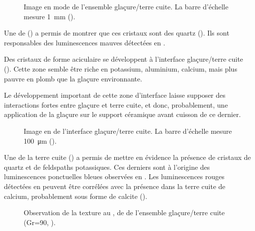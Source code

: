 \begin{figure}[htb]
  \caption[\ -- Observation de la texture au \MEB, 
           en mode \ERD. Ensemble glaçure/terre cuite]
          {\legendeB
           Image en mode \ERD de l'ensemble glaçure/terre cuite. 
           La barre d'échelle mesure \SI{1}{\mm} ().}
  \label{MEB:6529_img}
\end{figure}

Une \carto de \RX () a permis de montrer 
que ces cristaux sont des quartz (\quartz). Ils sont responsables 
des luminescences mauves détectées en \CL.

Des cristaux de forme aciculaire se développent à l'interface 
glaçure/terre cuite (). Cette zone semble être 
riche en potassium, aluminium, calcium, mais plus pauvre en plomb que 
la glaçure environnante.

Le développement important de cette zone d'interface laisse supposer 
des interactions fortes entre glaçure et terre cuite, et donc, 
probablement, une application de la glaçure sur le support céramique 
avant cuisson de ce dernier.

\begin{figure}[htb]
  \caption[\ -- Observation de la texture au \MEB, 
           en mode \ERD. Interface glaçure/terre cuite]
          {\legendeB
           Image en \ERD de l'interface glaçure/terre cuite. 
           La barre d'échelle mesure \SI{100}{\um} ().}
  \label{MEB:6529_img_int}
\end{figure}

Une \carto de la terre cuite () a permis de 
mettre en évidence la présence de cristaux de quartz et de feldspaths 
potassiques. Ces derniers sont à l'origine des luminescences 
ponctuelles bleues observées en \CL. Les luminescences rouges 
détectées en \CL peuvent être corrélées avec la présence dans la terre 
cuite de calcium, probablement sous forme de calcite (\calcite).

\begin{figure}[htb]
  \caption[\ -- Observation de la texture au \MEB, \carto de \RX de l'ensemble glaçure/terre cuite]
          {\legendeB
           Observation de la texture au \MEB, \carto de \RX de l'ensemble glaçure/terre cuite (Gr=90, ).}
  \label{MEB:6529_carto_tcgla}
\end{figure}

